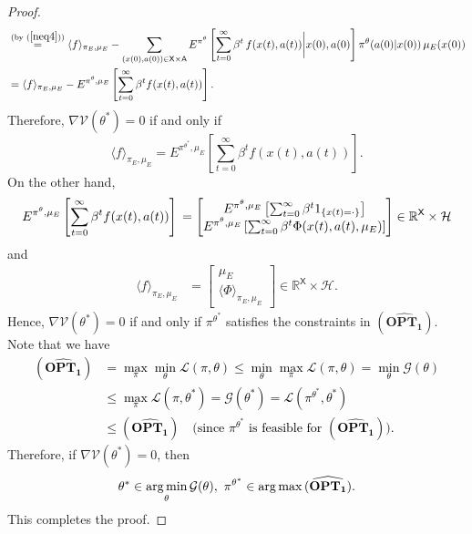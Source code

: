 \documentclass[11pt]{article}
\newcommand{\R}{\mathbb{R}}
\newcommand{\argmax}{\mathop{\rm arg\, max}}
\newcommand{\argmin}{\mathop{\rm arg\, min}}
\newcommand{\sX}{{\mathsf X}}
\newcommand{\sA}{{\mathsf A}}
\newcommand{\cH}{{\mathcal H}}
\newcommand{\cL}{{\mathcal L}}
\newcommand{\V}{{\mathcal V}}
\newcommand{\cG}{{\mathcal G}}
\newcommand{\lk}[1]{\textcolor{black}{#1}} %
\begin{document}
\begin{proof}
\begin{align*}
&\stackrel{(\text{by} \,\, (\ref{neq4}))}{=} \langle f \rangle_{\pi_E,\mu_E}  - \sum_{(x(0),a(0)) \in \sX \times \sA}   E^{\pi^{\theta}} \left[ \sum_{t=0}^{\infty} \beta^t \, f(x(t),a(t)) \bigg| x(0),a(0)  \right] \pi^{\theta}(a(0)|x(0)) \, \mu_E(x(0)) \\
&= \langle f \rangle_{\pi_E,\mu_E}  -   E^{\pi^{\theta},\mu_E} \left[ \sum_{t=0}^{\infty} \beta^t f(x(t),a(t)) \right].
\end{align*}
Therefore, $\nabla \V(\theta^*) = 0$ if and only if 
$$
\langle f \rangle_{\pi_E,\mu_E}  =   E^{\pi^{\theta^*},\mu_E} \left[ \sum_{t=0}^{\infty} \beta^t f(x(t),a(t)) \right].
$$
On the other hand,
$$E^{\pi^{\theta},\mu_E} \left[ \sum_{t=0}^{\infty} \beta^t f(x(t),a(t)) \right] \\ = \begin{bmatrix}
E^{\pi^{\theta},\mu_E} \left[ \sum_{t=0}^{\infty} \beta^t 1_{\{x(t) = \cdot\}} \right] \\ E^{\pi^{\theta},\mu_E} \left[ \sum_{t=0}^{\infty} \beta^t \Phi(x(t),a(t),\mu_E) \right]
\end{bmatrix} \in \R^{\sX} \times \cH$$
and
\begin{align*}
\langle f \rangle_{\pi_E,\mu_E} &= \begin{bmatrix}
\mu_E \\ \langle \Phi \rangle_{\pi_E,\mu_E}
\end{bmatrix} \in \R^{\sX} \times \cH.
\end{align*}
Hence, $\nabla \V(\theta^*) = 0$ if and only if $\pi^{\theta^*}$ satisfies the constraints in $\mathbf{(\widehat{OPT_1})}$. 
Note that we have
\lk{\begin{align*}
\mathbf{(\widehat{OPT_1})} &= \max_{\pi} \min_{\theta} \cL(\pi,\theta) 
\leq \min_{\theta} \max_{\pi} \cL(\pi,\theta) = \min_{\theta} \cG(\theta) \\
&\leq \max_{\pi} \cL(\pi,\theta^*) = \cG(\theta^*) = \cL(\pi^{\theta^*}, \theta^*) \\
&\leq \mathbf{(\widehat{OPT_1})} \quad \text{(since $\pi^{\theta^*}$ is feasible for $\mathbf{(\widehat{OPT_1})}$).}
\end{align*}}
Therefore, if $\nabla \V(\theta^*) = 0$, then
\begin{align*}
\theta^* \in \argmin_{\theta} \cG(\theta), \,\, \pi^{\theta^*} \in \argmax  \mathbf{\widehat{(OPT_1)}}.
\end{align*}
This completes the proof.


\end{proof}
\end{document}
